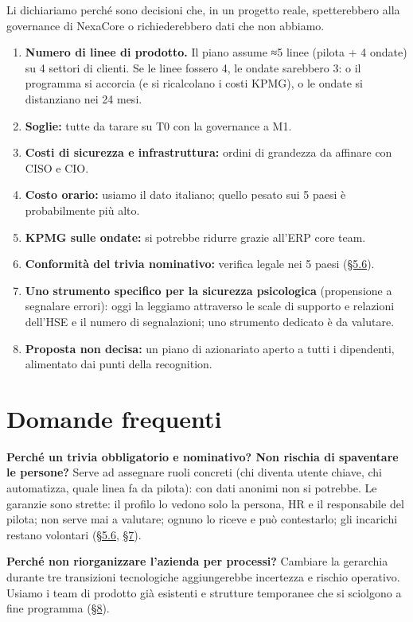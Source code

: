 \documentclass[11pt,a4paper]{article}
\begin{document}
Li dichiariamo perché sono decisioni che, in un progetto reale, spetterebbero alla governance di NexaCore o richiederebbero dati che non abbiamo.
\begin{enumerate}
\item \textbf{Numero di linee di prodotto.} Il piano assume ≈5 linee (pilota + 4 ondate) su 4 settori di clienti. Se le linee fossero 4, le ondate sarebbero 3: o il programma si accorcia (e si ricalcolano i costi KPMG), o le ondate si distanziano nei 24 mesi.
\item \textbf{Soglie:} tutte da tarare su T0 con la governance a M1.
\item \textbf{Costi di sicurezza e infrastruttura:} ordini di grandezza da affinare con CISO e CIO.
\item \textbf{Costo orario:} usiamo il dato italiano; quello pesato sui 5 paesi è probabilmente più alto.
\item \textbf{KPMG sulle ondate:} si potrebbe ridurre grazie all'ERP core team.
\item \textbf{Conformità del trivia nominativo:} verifica legale nei 5 paesi (\hyperref[sec:5.6]{\S5.6}).
\item \textbf{Uno strumento specifico per la sicurezza psicologica} (propensione a segnalare errori): oggi la leggiamo attraverso le scale di supporto e relazioni dell'HSE e il numero di segnalazioni; uno strumento dedicato è da valutare.
\item \textbf{Proposta non decisa:} un piano di azionariato aperto a tutti i dipendenti, alimentato dai punti della recognition.
\end{enumerate}

\section{Domande frequenti}\label{sec:20}

\textbf{Perché un trivia obbligatorio e nominativo? Non rischia di spaventare le persone?}
Serve ad assegnare ruoli concreti (chi diventa utente chiave, chi automatizza, quale linea fa da pilota): con dati anonimi non si potrebbe. Le garanzie sono strette: il profilo lo vedono solo la persona, HR e il responsabile del pilota; non serve mai a valutare; ognuno lo riceve e può contestarlo; gli incarichi restano volontari (\hyperref[sec:5.6]{\S5.6}, \hyperref[sec:7]{\S7}).

\textbf{Perché non riorganizzare l'azienda per processi?}
Cambiare la gerarchia durante tre transizioni tecnologiche aggiungerebbe incertezza e rischio operativo. Usiamo i team di prodotto già esistenti e strutture temporanee che si sciolgono a fine programma (\hyperref[sec:8]{\S8}).
\end{document}
